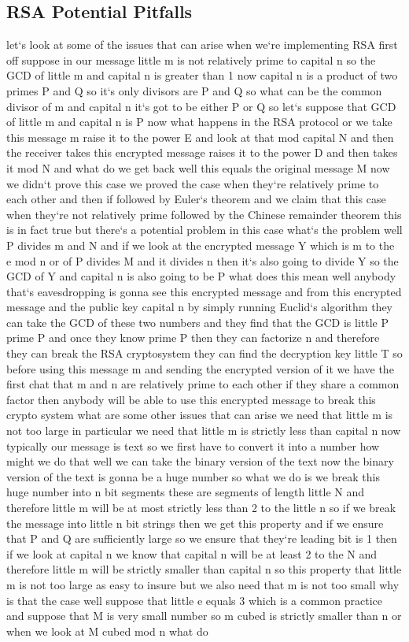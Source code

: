 \subsection{RSA  Potential Pitfalls}
let`s look at some of the issues that can arise when we`re implementing RSA first off suppose in our message little m is not relatively prime to capital n so the GCD of little m and capital n is greater than 1 now capital n is a product of two primes P and Q so it`s only divisors are P and Q so what can be the common divisor of m and capital n it`s got to be either P or Q so let`s suppose that GCD of little m and capital n is P now what happens in the RSA protocol or we take this message m raise it to the power E and look at that mod capital N and then the receiver takes this encrypted message raises it to the power D and then takes it mod N and what do we get back well this equals the original message M now we didn`t prove this case we proved the case when they`re relatively prime to each other and then if followed by Euler`s theorem and we claim that this case when they`re not relatively prime followed by the Chinese remainder theorem this is in fact true but there`s a potential problem in this case what`s the problem well P divides m and N and if we look at the encrypted message Y which is m to the e mod n or of P divides M and it divides n then it`s also going to divide Y so the GCD of Y and capital n is also going to be P what does this mean well anybody that`s eavesdropping is gonna see this encrypted message and from this encrypted message and the public key capital n by simply running Euclid`s algorithm they can take the GCD of these two numbers and they find that the GCD is little P prime P and once they know prime P then they can factorize n and therefore they can break the RSA cryptosystem they can find the decryption key little T so before using this message m and sending the encrypted version of it we have the first chat that m and n are relatively prime to each other if they share a common factor then anybody will be able to use this encrypted message to break this crypto system what are some other issues that can arise we need that little m is not too large in particular we need that little m is strictly less than capital n now typically our message is text so we first have to convert it into a number how might we do that well we can take the binary version of the text now the binary version of the text is gonna be a huge number so what we do is we break this huge number into n bit segments these are segments of length little N and therefore little m will be at most strictly less than 2 to the little n so if we break the message into little n bit strings then we get this property and if we ensure that P and Q are sufficiently large so we ensure that they`re leading bit is 1 then if we look at capital n we know that capital n will be at least 2 to the N and therefore little m will be strictly smaller than capital n so this property that little m is not too large as easy to insure but we also need that m is not too small why is that the case well suppose that little e equals 3 which is a common practice and suppose that M is very small number so m cubed is strictly smaller than n or when we look at M cubed mod n what do 
